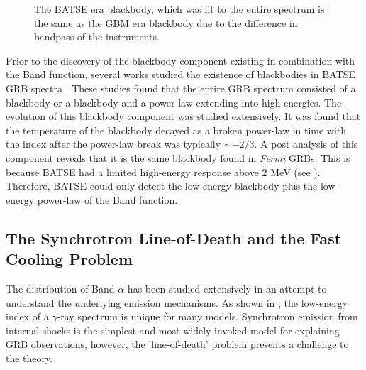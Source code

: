 \begin{figure}[h]
  \centering
  \caption{The BATSE
    era blackbody, which was fit to the entire spectrum is the same as
    the GBM era blackbody due to the difference in bandpass of the
    instruments.}
  \label{fig:batseBB}
\end{figure}


Prior to the discovery of the blackbody component existing in
combination with the Band function, several works studied the
existence of blackbodies in BATSE GRB spectra
\cite{Ryde:2009,Ryde:2006,Ryde:2005,Ryde:2004}. These studies found
that the entire GRB spectrum consisted of a blackbody or a blackbody
and a power-law extending into high energies. The evolution of this
blackbody component was studied extensively. It was found that the
temperature of the blackbody decayed as a broken power-law in time
with the index after the power-law break was typically $\sim-2/3$. A
post analysis of this component reveals that it is the same blackbody
found in {\it Fermi} GRBs. This is because BATSE had a limited
high-energy response above 2 MeV (see
). Therefore, BATSE could only detect the
low-energy blackbody plus the low-energy power-law of the Band
function.

\subsection{The Synchrotron Line-of-Death and the Fast Cooling Problem}
\label{sec:spec:lod}
The distribution of Band $\alpha$ has been studied extensively in an
attempt to understand the underlying emission mechanisms. As shown
in , the low-energy index of a
$\gamma$-ray spectrum is unique for many models. Synchrotron emission
from internal shocks is the simplest and most widely invoked model for
explaining GRB observations, however, the 'line-of-death' problem
presents a challenge to the theory.

